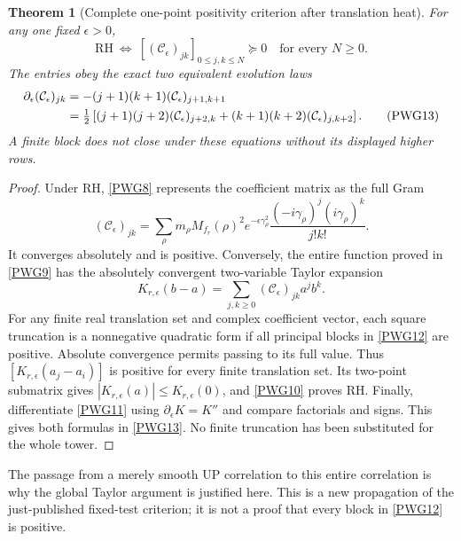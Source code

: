 \documentclass[11pt,a4paper]{article}
\newtheorem{theorem}{Theorem}[section]
\theoremstyle{definition}\newtheorem{definition}[theorem]{Definition}
\begin{document}
\begin{theorem}[Complete one-point positivity criterion after translation heat]
For any one fixed $\epsilon>0$,
\begin{equation}
 \boxed{\mathrm{RH}\ \Longleftrightarrow\
 [ (\mathcal C_\epsilon)_{jk}]_{0\le j,k\le N}\succeq0
 \quad\text{for every }N\ge0.}                            \tag{PWG12}\label{PWG12}
\end{equation}
The entries obey the exact two equivalent evolution laws
\begin{align}
 \partial_\epsilon(\mathcal C_\epsilon)_{jk}
 & =-(j+1)(k+1)(\mathcal C_\epsilon)_{j+1,k+1}\notag\\
 & =\tfrac12\left[(j+1)(j+2)(\mathcal C_\epsilon)_{j+2,k}
                  +(k+1)(k+2)(\mathcal C_\epsilon)_{j,k+2}\right].
                                                               \tag{PWG13}\label{PWG13}
\end{align}
A finite block does not close under these equations without its displayed higher rows.
\end{theorem}
\begin{proof}
Under RH, \eqref{PWG8} represents the coefficient matrix as the full Gram
\[
 (\mathcal C_\epsilon)_{jk}=
 \sum_\rho m_\rho M_{f_r}(\rho)^2e^{-\epsilon\gamma_\rho^2}
 \frac{(-i\gamma_\rho)^j(i\gamma_\rho)^k}{j!k!}.
\]
It converges absolutely and is positive. Conversely, the entire function proved in \eqref{PWG9} has the absolutely convergent two-variable Taylor expansion
\[
 K_{r,\epsilon}(b-a)
 =\sum_{j,k\ge0}(\mathcal C_\epsilon)_{jk}a^jb^k.
\]
For any finite real translation set and complex coefficient vector, each square truncation is a nonnegative quadratic form if all principal blocks in \eqref{PWG12} are positive. Absolute convergence permits passing to its full value. Thus $[K_{r,\epsilon}(a_j-a_i)]$ is positive for every finite translation set. Its two-point submatrix gives $|K_{r,\epsilon}(a)|\le K_{r,\epsilon}(0)$, and \eqref{PWG10} proves RH. Finally, differentiate \eqref{PWG11} using $\partial_\epsilon K=K''$ and compare factorials and signs. This gives both formulas in \eqref{PWG13}. No finite truncation has been substituted for the whole tower.
\end{proof}

The passage from a merely smooth UP correlation to this entire correlation is why the global Taylor argument is justified here. This is a new propagation of the just-published fixed-test criterion; it is not a proof that every block in \eqref{PWG12} is positive.
\end{document}
